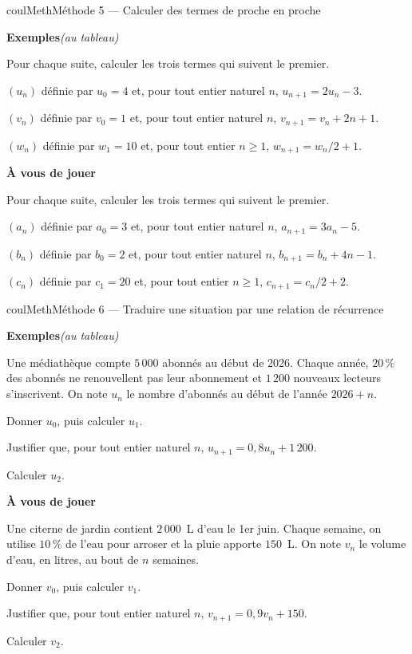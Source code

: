 \documentclass[11pt,a4paper]{article}
\makeatletter
\renewcommand{\ge}{\geqslant}
\newcounter{lycee@signet}
\newcommand{\signet}[3][]{\stepcounter{lycee@signet}%
  \edef\lycee@dest{\if\relax\detokenize{#1}\relax
    signet.\arabic{lycee@signet}\else#1\fi}%
  \hypertarget{\lycee@dest}{}\bookmark[level=#2,dest=\lycee@dest]{#3}}
\def\textsuperscript#1{#1}\def\dfrac#1#2{#1/#2}\def\frac#1#2{#1/#2}%
\newcounter{methode}
\newenvironment{methodebox}[1][Méthode]{\stepcounter{methode}%
  \begin{boitecours}[phantom={\signet[methode-\arabic{methode}]{2}{#1}}]{coulMeth}{#1}}%
  {\end{boitecours}}
\newcommand{\etape}[1]{\par\smallskip\textbf{\color{coulMeth}#1}\par\nobreak\smallskip}
\newcommand{\autableau}{\hfill{\footnotesize\itshape\color{black!45}(au tableau)}}
\newcommand{\etapeexemples}{%
    \par\smallskip\textbf{\color{coulMeth}Exemples}\autableau\par\nobreak\smallskip}
\makeatother
\begin{document}
\begin{methodebox}[Méthode 5 --- Calculer des termes de proche en proche]
\etapeexemples
Pour chaque suite, calculer les trois termes qui suivent le premier.
\begin{questions}[label=\alph*)]
  \item $(u_{n})$ définie par $u_{0}=4$ et, pour tout entier naturel $n$, $u_{n+1}=2u_{n}-3$.
  \item $(v_{n})$ définie par $v_{0}=1$ et, pour tout entier naturel $n$, $v_{n+1}=v_{n}+2n+1$.
  \item $(w_{n})$ définie par $w_{1}=10$ et, pour tout entier $n\ge 1$, $w_{n+1}=\dfrac{w_{n}}{2}+1$.
\end{questions}

\etape{À vous de jouer}
Pour chaque suite, calculer les trois termes qui suivent le premier.
\begin{questions}[label=\alph*)]
  \item $(a_{n})$ définie par $a_{0}=3$ et, pour tout entier naturel $n$, $a_{n+1}=3a_{n}-5$.
  \item $(b_{n})$ définie par $b_{0}=2$ et, pour tout entier naturel $n$, $b_{n+1}=b_{n}+4n-1$.
  \item $(c_{n})$ définie par $c_{1}=20$ et, pour tout entier $n\ge 1$, $c_{n+1}=\dfrac{c_{n}}{2}+2$.
\end{questions}

\end{methodebox}

\begin{methodebox}[Méthode 6 --- Traduire une situation par une relation de récurrence]
\etapeexemples
Une médiathèque compte $5\,000$ abonnés au début de 2026. Chaque année, $20\,\%$ des
abonnés ne renouvellent pas leur abonnement et $1\,200$ nouveaux lecteurs s'inscrivent.
On note $u_{n}$ le nombre d'abonnés au début de l'année $2026+n$.
\begin{questions}[label=\alph*)]
  \item Donner $u_{0}$, puis calculer $u_{1}$.
  \item Justifier que, pour tout entier naturel $n$, $u_{n+1}=0{,}8u_{n}+1\,200$.
  \item Calculer $u_{2}$.
\end{questions}

\etape{À vous de jouer}
Une citerne de jardin contient $2\,000$~L d'eau le 1\textsuperscript{er} juin. Chaque
semaine, on utilise $10\,\%$ de l'eau pour arroser et la pluie apporte $150$~L. On note
$v_{n}$ le volume d'eau, en litres, au bout de $n$ semaines.
\begin{questions}[label=\alph*)]
  \item Donner $v_{0}$, puis calculer $v_{1}$.
  \item Justifier que, pour tout entier naturel $n$, $v_{n+1}=0{,}9v_{n}+150$.
  \item Calculer $v_{2}$.
\end{questions}

\end{methodebox}
\end{document}
